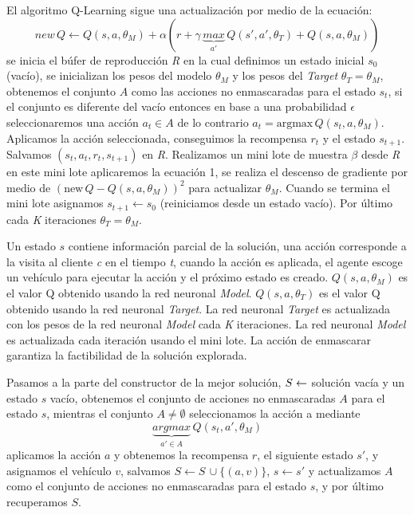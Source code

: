 \documentclass[10pt]{article}
\begin{document}
El algoritmo Q-Learning sigue una actualización por medio de la ecuación: \[ new \, Q \leftarrow Q(s,a,\theta_M) + \alpha (r+\gamma \, \underbrace{max}_{a'} \, Q(s',a',\theta_T) + Q(s,a,\theta_M)) \] se inicia el búfer de reproducción \textit{R} en la cual definimos un estado inicial $s_0$ (vacío), se inicializan los pesos del modelo $\theta_M$ y los pesos del \textit{Target} $\theta_T = \theta_M$, obtenemos el conjunto $A$ como las acciones no enmascaradas para el estado $s_t$, si el conjunto es diferente del vacío entonces en base a una probabilidad $\epsilon$ seleccionaremos una acción $a_t \in A$ de lo contrario $a_t = \text{argmax} \, Q (s_t,a,\theta_M)$. Aplicamos la acción seleccionada, conseguimos la recompensa $r_t$ y el estado $s_{t+1}$. Salvamos $(s_t,a_t,r_t,s_{t+1})$ en \textit{R}. Realizamos un mini lote de muestra $\beta$ desde \textit{R} en este mini lote aplicaremos la ecuación 1, se realiza el descenso de gradiente por medio de $(\text{new} \, Q -Q(s,a,\theta_M))^2$ para actualizar $\theta_M$. Cuando se termina el mini lote asignamos $s_{t+1} \leftarrow s_0$ (reiniciamos desde un estado vacío). Por último cada \textit{K} iteraciones $\theta_T = \theta_M$.

Un estado $s$ contiene información parcial de la solución, una acción corresponde a la visita al cliente \textit{c} en el tiempo \textit{t}, cuando la acción es aplicada, el agente escoge un vehículo para ejecutar la acción y el próximo estado es creado. $Q(s,a,\theta_M)$ es el valor Q obtenido usando la red neuronal \textit{Model}. $Q(s,a,\theta_T)$ es el valor Q obtenido usando la red neuronal \textit{Target}. La red neuronal \textit{Target} es actualizada con los pesos de la red neuronal \textit{Model} cada \textit{K} iteraciones. La red neuronal \textit{Model} es actualizada cada iteración usando el mini lote. La acción de enmascarar garantiza la factibilidad de la solución explorada.

Pasamos a la parte del constructor de la mejor solución, $S \leftarrow \empty$ solución vacía y un estado $s$ vacío, obtenemos el conjunto de acciones no enmascaradas $A$ para el estado $s$, mientras el conjunto $A \neq \emptyset$ seleccionamos la acción a mediante $$ \underbrace{argmax}_{a' \in A} \, Q (s_t,a',\theta_M) $$ aplicamos la acción $a$ y obtenemos la recompensa $r$, el siguiente estado $s'$, y asignamos el vehículo $v$, salvamos $S \leftarrow S \,\cup \{ (a,v)\} $, $s \leftarrow s'$ y actualizamos $A$ como el conjunto de acciones no enmascaradas para el estado $s$, y por último recuperamos $S$.
%
%
\end{document}
